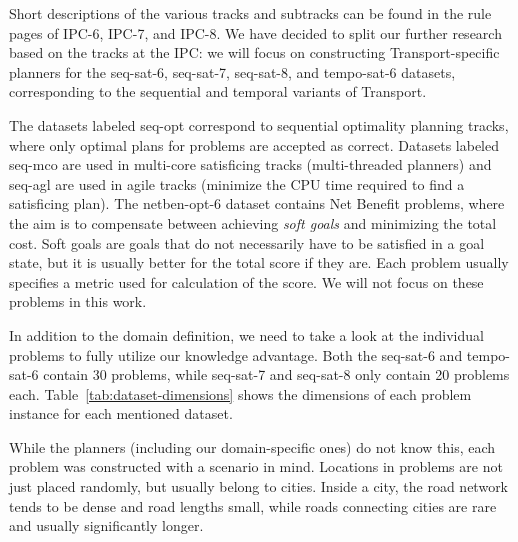 Short descriptions of the various tracks and subtracks can be found in the rule pages of IPC-6,
IPC-7,
and IPC-8.
We have decided to split our further research based on the tracks at the IPC: we will focus on constructing
Transport-specific planners for the seq-sat-6, seq-sat-7, seq-sat-8, and tempo-sat-6 datasets,
corresponding to the sequential and temporal variants of Transport.

The datasets labeled seq-opt correspond to sequential optimality planning tracks,
where only optimal plans for problems are accepted as correct.
Datasets labeled seq-mco are used in multi-core satisficing tracks (multi-threaded planners)
and seq-agl are used in agile tracks (minimize the CPU time required to find a satisficing plan).
The netben-opt-6 dataset contains Net Benefit problems, where the aim
is to compensate between achieving \textit{soft goals} and minimizing the total cost.
Soft goals are goals that do not necessarily have to be satisfied in a goal state,
but it is usually better for the total score if they are.
Each problem usually specifies a metric used for calculation of the score.
We will not focus on 
these problems in this work.

In addition to the domain definition, we need to take a look at the individual problems to fully utilize our knowledge advantage.
Both the seq-sat-6 and tempo-sat-6 contain 30 problems, while seq-sat-7 and seq-sat-8 only contain 20 problems each. Table~\ref{tab:dataset-dimensions} shows the
dimensions of each problem instance for each mentioned dataset.

While the planners (including our domain-specific ones) do not know this,
each problem was constructed with a scenario in mind. Locations in problems are not just
placed randomly, but usually belong to cities. Inside a city, the road network
tends to be dense and road lengths small, while roads connecting cities
are rare and usually significantly longer.


